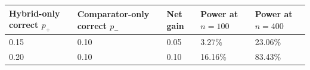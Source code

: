 \begin{longtable}[]{@{}lllll@{}}
\toprule
\begin{minipage}[b]{0.17\columnwidth}\raggedright
Hybrid-only correct \(p_+\)\strut
\end{minipage} & \begin{minipage}[b]{0.17\columnwidth}\raggedright
Comparator-only correct \(p_-\)\strut
\end{minipage} & \begin{minipage}[b]{0.17\columnwidth}\raggedright
Net gain\strut
\end{minipage} & \begin{minipage}[b]{0.17\columnwidth}\raggedright
Power at \(n=100\)\strut
\end{minipage} & \begin{minipage}[b]{0.17\columnwidth}\raggedright
Power at \(n=400\)\strut
\end{minipage}\tabularnewline
\midrule
\endhead
\begin{minipage}[t]{0.17\columnwidth}\raggedright
0.15\strut
\end{minipage} & \begin{minipage}[t]{0.17\columnwidth}\raggedright
0.10\strut
\end{minipage} & \begin{minipage}[t]{0.17\columnwidth}\raggedright
0.05\strut
\end{minipage} & \begin{minipage}[t]{0.17\columnwidth}\raggedright
3.27\%\strut
\end{minipage} & \begin{minipage}[t]{0.17\columnwidth}\raggedright
23.06\%\strut
\end{minipage}\tabularnewline
\begin{minipage}[t]{0.17\columnwidth}\raggedright
0.20\strut
\end{minipage} & \begin{minipage}[t]{0.17\columnwidth}\raggedright
0.10\strut
\end{minipage} & \begin{minipage}[t]{0.17\columnwidth}\raggedright
0.10\strut
\end{minipage} & \begin{minipage}[t]{0.17\columnwidth}\raggedright
16.16\%\strut
\end{minipage} & \begin{minipage}[t]{0.17\columnwidth}\raggedright
83.43\%\strut
\end{minipage}\tabularnewline

\end{longtable}
